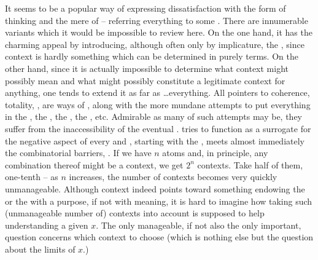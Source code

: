 It seems to be a popular way of expressing dissatisfaction with the
 form of  thinking and the mere
 of   -- referring everything to
some .  There are innumerable variants which it would be impossible
to review here.  On the one hand, it has the charming appeal by introducing,
although often only by implicature, the , since context is hardly
something which can be determined in purely  terms.  On the other
hand, since it is actually impossible to determine what context might possibly
mean and what might possibly constitute a legitimate context for anything, one
tends to extend it as far as \ldots everything.  All pointers to coherence,
totality, , are ways of , along with the
more mundane attempts to put everything in the , the
, the , the ,
etc.  Admirable as many of such attempts may be, they suffer from the
inaccessibility of the eventual .  tries to function as a
surrogate for the negative aspect of every  and
, starting with the 
, meets almost immediately the combinatorial barriers,
.  If we have $n$ atoms and, in principle, any
combination thereof might be a context, we get $2^{n}$ contexts.  Take half of
them, one-tenth -- as $n$ increases, the number of contexts becomes very quickly
unmanageable.  Although context indeed points toward something endowing the
 or the  with a purpose, if not with meaning, it is hard
to imagine how taking such (unmanageable number of) contexts into account is
supposed to help understanding a given  $x$. The only manageable, if
not also the only important, question concerns which context to choose (which is
nothing else but the question about the limits of $x$.)

